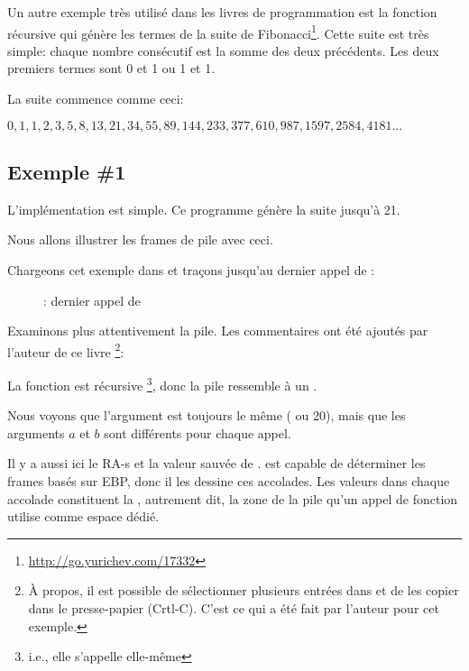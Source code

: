 
Un autre exemple très utilisé dans les livres de programmation est la fonction récursive
qui génère les termes de la suite de Fibonacci\footnote{\url{http://go.yurichev.com/17332}}.
Cette suite est très simple: chaque nombre consécutif est la somme des deux précédents.
Les deux premiers termes sont 0 et 1 ou 1 et 1.

La suite commence comme ceci:

\begin{center}
$0, 1, 1, 2, 3, 5, 8, 13, 21, 34, 55, 89, 144, 233, 377, 610, 987, 1597, 2584, 4181 ...$
\end{center}

\subsection{Exemple \#1}

L'implémentation est simple. Ce programme génère la suite jusqu'à 21.





Nous allons illustrer les frames de pile avec ceci.

\clearpage

Chargeons cet exemple dans \olly et traçons jusqu'au dernier appel de \ttf{}:

\begin{figure}[H]
\centering
{}
\caption{\olly: dernier appel de \ttf{}}
\label{fig:fib_olly}
\end{figure}

\clearpage
Examinons plus attentivement la pile.
Les commentaires ont été ajoutés par l'auteur de ce livre
\footnote{ À propos, il est possible de sélectionner plusieurs entrées dans \olly
et de les copier dans le presse-papier (Crtl-C).
C'est ce qui a été fait par l'auteur pour cet exemple.}:



La fonction est récursive \footnote{i.e., elle s'appelle elle-même}, donc la pile
ressemble à un .

Nous voyons que l'argument  est toujours le même ( ou 20), mais
que les arguments $a$ et $b$ sont différents pour chaque appel.

Il y a aussi ici le \ac{RA}-s et la valeur sauvée de \EBP.
\olly est capable de déterminer les frames basés sur EBP, donc il les dessine ces
accolades. Les valeurs dans chaque accolade constituent la ,
autrement dit, la zone de la pile qu'un appel de fonction utilise comme espace dédié.

